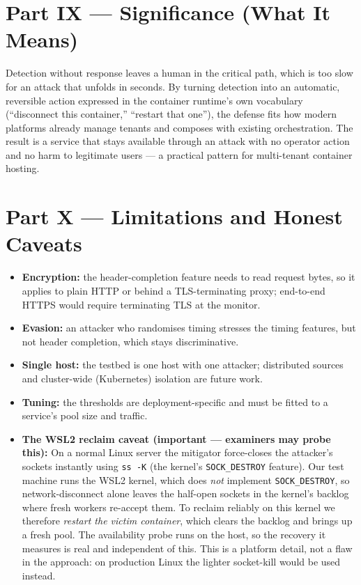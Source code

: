 \documentclass[11pt,a4paper]{article}
\begin{document}
\section{Part IX --- Significance (What It Means)}
Detection without response leaves a human in the critical path, which is too slow
for an attack that unfolds in seconds. By turning detection into an automatic,
reversible action expressed in the container runtime's own vocabulary
(``disconnect this container,'' ``restart that one''), the defense fits how modern
platforms already manage tenants and composes with existing orchestration. The
result is a service that stays available through an attack with no operator action
and no harm to legitimate users --- a practical pattern for multi-tenant container
hosting.

\section{Part X --- Limitations and Honest Caveats}
\begin{itemize}
  \item \textbf{Encryption:} the header-completion feature needs to read request
  bytes, so it applies to plain HTTP or behind a TLS-terminating proxy; end-to-end
  HTTPS would require terminating TLS at the monitor.
  \item \textbf{Evasion:} an attacker who randomises timing stresses the timing
  features, but not header completion, which stays discriminative.
  \item \textbf{Single host:} the testbed is one host with one attacker;
  distributed sources and cluster-wide (Kubernetes) isolation are future work.
  \item \textbf{Tuning:} the thresholds are deployment-specific and must be fitted
  to a service's pool size and traffic.
  \item \textbf{The WSL2 reclaim caveat (important --- examiners may probe this):}
  On a normal Linux server the mitigator force-closes the attacker's sockets
  instantly using \texttt{ss -K} (the kernel's \texttt{SOCK\_DESTROY} feature). Our
  test machine runs the WSL2 kernel, which does \emph{not} implement
  \texttt{SOCK\_DESTROY}, so network-disconnect alone leaves the half-open sockets
  in the kernel's backlog where fresh workers re-accept them. To reclaim reliably
  on this kernel we therefore \emph{restart the victim container}, which clears the
  backlog and brings up a fresh pool. The availability probe runs on the host, so
  the recovery it measures is real and independent of this. This is a platform
  detail, not a flaw in the approach: on production Linux the lighter socket-kill
  would be used instead.
\end{itemize}
\end{document}
